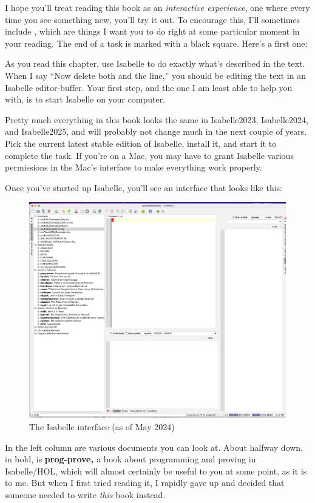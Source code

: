 I hope you'll treat reading this book as an \emph{interactive experience}, one where every time you see something new, you'll try it out. To encourage this, I'll sometimes include , which are things I want you to do right at some particular moment in your reading. The end of a task is marked with a black square. Here's a first one:

\task
As you read this chapter, use Isabelle to do exactly what's described in the text. When I say ``Now delete both  and the  line,'' you should be editing the text in an Isabelle editor-buffer. Your first step, and the one I am least able to help you with, is to start Isabelle on your computer. 
\etask

Pretty much everything in this book looks the same in Isabelle2023, Isabelle2024, and Isabelle2025, and will probably not change much in the next couple of years. Pick the current latest stable edition of Isabelle, install it, and start it to complete the task. If you're on a Mac, you may have to grant Isabelle various permissions in the Mac's interface to make everything work properly. 

Once you've started up Isabelle, you'll see an interface that looks like this:
\begin{figure}[h]
    \centering
    \includegraphics[width=0.7\linewidth]{TEXT//C01//Images/interface.png}
    \caption{The Isabelle interface (as of May 2024)}
    \label{fig:C1-interface}
\end{figure}
In the left column are various documents you can look at. About halfway down, in bold, is \textbf{prog-prove}\textit{\textbf{,}} a book about programming and proving in Isabelle/HOL, which will almost certainly be useful to you at some point, as it is to me. But when I first tried reading it, I rapidly gave up and decided that someone needed to write \textit{this} book instead. 

